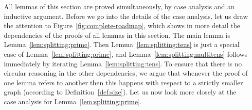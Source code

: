 \documentclass{lmcs} %
\theoremstyle{plain}
\begin{document}
All lemmas of this section are proved simultaneously, by case analysis
and an inductive argument. Before we go into the details of the
case analysis, let us draw the attention to
Figure~\ref{fig:complete-roadmap}, which shows in more detail the
dependencies of the proofs of all lemmas in this section.
The main lemma is Lemma~\ref{lem:splitting:prime}. Then
Lemma~\ref{lem:splitting:tens} is just a special case of
Lemma~\ref{lem:splitting:prime}, and
Lemma~\ref{lem:splitting:multitens} follows immediately by iterating
Lemma~\ref{lem:splitting:tens}.
To ensure
that there is no circular reasoning in the other dependencies, we argue that whenever the proof
of one lemma refers to another then this happens with respect to a
strictly smaller graph (according to Definition~\ref{def:size}).
Let us now look more closely at the case analysis for Lemma~\ref{lem:splitting:prime}.
\end{document}
